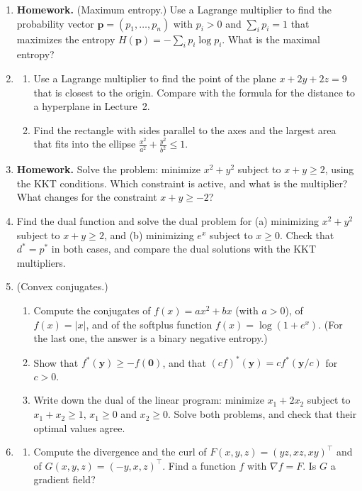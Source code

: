 \documentclass[11pt]{article}
\newcommand{\homework}{\textcolor{red!70!black}{\textbf{Homework.}}}
\theoremstyle{definition}
\theoremstyle{plain}
\theoremstyle{remark}
\begin{document}
\begin{enumerate}[leftmargin=*]
    \item \homework{} (Maximum entropy.) Use a Lagrange multiplier to find the probability vector $\mathbf{p} = (p_1, \ldots, p_n)$ with $p_i > 0$ and $\sum_i p_i = 1$ that maximizes the entropy $H(\mathbf{p}) = -\sum_i p_i\log p_i$. What is the maximal entropy?
    \item \begin{enumerate}[label=(\alph*)]
        \item Use a Lagrange multiplier to find the point of the plane $x + 2y + 2z = 9$ that is closest to the origin. Compare with the formula for the distance to a hyperplane in Lecture~2.
        \item Find the rectangle with sides parallel to the axes and the largest area that fits into the ellipse $\frac{x^2}{a^2} + \frac{y^2}{b^2} \leq 1$.
    \end{enumerate}
    \item \homework{} Solve the problem: minimize $x^2 + y^2$ subject to $x + y \geq 2$, using the KKT conditions. Which constraint is active, and what is the multiplier? What changes for the constraint $x + y \geq -2$?
    \item Find the dual function and solve the dual problem for (a) minimizing $x^2 + y^2$ subject to $x + y \geq 2$, and (b) minimizing $e^x$ subject to $x \geq 0$. Check that $d^* = p^*$ in both cases, and compare the dual solutions with the KKT multipliers.
    \item (Convex conjugates.)
    \begin{enumerate}[label=(\alph*)]
        \item Compute the conjugates of $f(x) = ax^2 + bx$ (with $a > 0$), of $f(x) = |x|$, and of the softplus function $f(x) = \log(1 + e^x)$. (For the last one, the answer is a binary negative entropy.)
        \item Show that $f^*(\mathbf{y}) \geq -f(\mathbf{0})$, and that $(cf)^*(\mathbf{y}) = cf^*(\mathbf{y}/c)$ for $c > 0$.
        \item Write down the dual of the linear program: minimize $x_1 + 2x_2$ subject to $x_1 + x_2 \geq 1$, $x_1 \geq 0$ and $x_2 \geq 0$. Solve both problems, and check that their optimal values agree.
    \end{enumerate}
    \item \begin{enumerate}[label=(\alph*)]
        \item Compute the divergence and the curl of $F(x, y, z) = (yz, xz, xy)^\top$ and of $G(x, y, z) = (-y, x, z)^\top$. Find a function $f$ with $\nabla f = F$. Is $G$ a gradient field?

\end{enumerate}
\end{enumerate}
\end{document}
